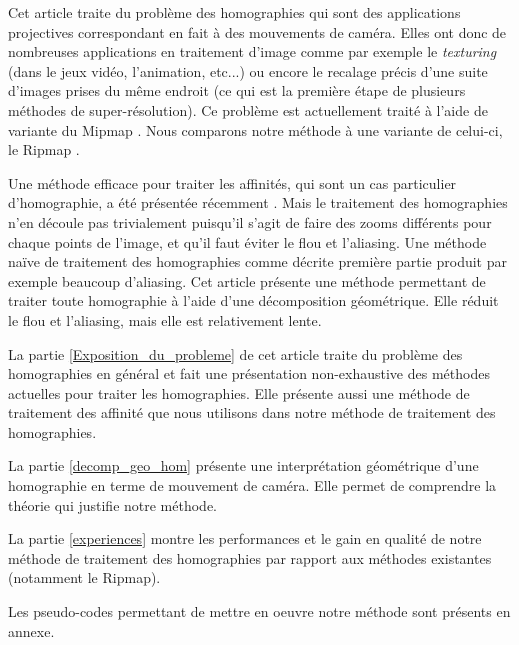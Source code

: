 	Cet article traite du problème des homographies qui sont des applications projectives correspondant en fait à des mouvements de caméra. Elles ont donc de nombreuses applications en traitement d'image comme par exemple le \emph{texturing} \cite{heckbert1983texture} (dans le jeux vidéo, l'animation, etc...) ou encore le recalage précis d'une suite d'images prises du même endroit \cite{brown2007automatic} (ce qui est la première étape de plusieurs méthodes de super-résolution). Ce problème est actuellement traité à l'aide de variante du Mipmap \cite{williams1983pyramidal}. Nous comparons notre méthode à une variante de celui-ci, le Ripmap \cite{akenine2008real}.

	Une méthode efficace pour traiter les affinités, qui sont un cas particulier d'homographie, a été présentée récemment \cite{szeliski2010high}. Mais le traitement des homographies n'en découle pas trivialement puisqu'il s'agit de faire des zooms différents pour chaque points de l'image, et qu'il faut éviter le flou et l'aliasing. Une méthode naïve de traitement des homographies comme décrite première partie produit par exemple beaucoup d'aliasing. Cet article présente une méthode permettant de traiter toute homographie à l'aide d'une décomposition géométrique. Elle réduit le flou et l'aliasing, mais elle est relativement lente.

	La partie \ref{Exposition_du_probleme} de cet article traite du problème des homographies en général et fait une présentation non-exhaustive des méthodes actuelles pour traiter les homographies. Elle présente aussi une méthode de traitement des affinité que nous utilisons dans notre méthode de traitement des homographies. 

	La partie \ref{decomp_geo_hom} présente une interprétation géométrique d'une homographie en terme de mouvement de caméra. Elle permet de comprendre la théorie qui justifie notre méthode.

	La partie \ref{experiences} montre les performances et le gain en qualité de notre méthode de traitement des homographies par rapport aux méthodes existantes (notamment le Ripmap).

	Les pseudo-codes permettant de mettre en oeuvre notre méthode sont présents en annexe.
